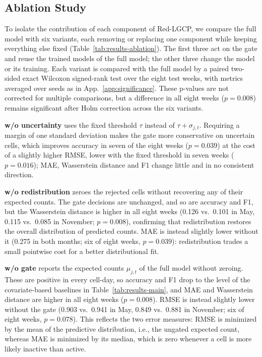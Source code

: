 \subsection{Ablation Study}
\label{app:ablation}

To isolate the contribution of each component of Red-LGCP, we compare the full model with six variants, each removing or replacing one component while keeping everything else fixed (Table~\ref{tab:results-ablation}). The first three act on the gate and reuse the trained models of the full model; the other three change the model or its training. Each variant is compared with the full model by a paired two-sided exact Wilcoxon signed-rank test over the eight test weeks, with metrics averaged over seeds as in App.~\ref{app:significance}. These p-values are not corrected for multiple comparisons, but a difference in all eight weeks ($p=0.008$) remains significant after Holm correction across the six variants.

\textbf{w/o uncertainty} uses the fixed threshold $\tau$ instead of $\tau+\sigma_{j,t}$. Requiring a margin of one standard deviation makes the gate more conservative on uncertain cells, which improves accuracy in seven of the eight weeks ($p=0.039$) at the cost of a slightly higher RMSE, lower with the fixed threshold in seven weeks ($p=0.016$); MAE, Wasserstein distance and F1 change little and in no consistent direction.

\textbf{w/o redistribution} zeroes the rejected cells without recovering any of their expected counts. The gate decisions are unchanged, and so are accuracy and F1, but the Wasserstein distance is higher in all eight weeks (0.126 vs.\ 0.101 in May, 0.115 vs.\ 0.085 in November; $p=0.008$), confirming that redistribution restores the overall distribution of predicted counts. MAE is instead slightly lower without it (0.275 in both months; six of eight weeks, $p=0.039$): redistribution trades a small pointwise cost for a better distributional fit.

\textbf{w/o gate} reports the expected counts $\mu_{j,t}$ of the full model without zeroing. These are positive in every cell-day, so accuracy and F1 drop to the level of the covariate-based baselines in Table~\ref{tab:results-main}, and MAE and Wasserstein distance are higher in all eight weeks ($p=0.008$). RMSE is instead slightly lower without the gate (0.903 vs.\ 0.941 in May, 0.849 vs.\ 0.881 in November; six of eight weeks, $p=0.078$). This reflects the two error measures: RMSE is minimized by the mean of the predictive distribution, i.e., the ungated expected count, whereas MAE is minimized by its median, which is zero whenever a cell is more likely inactive than active.

